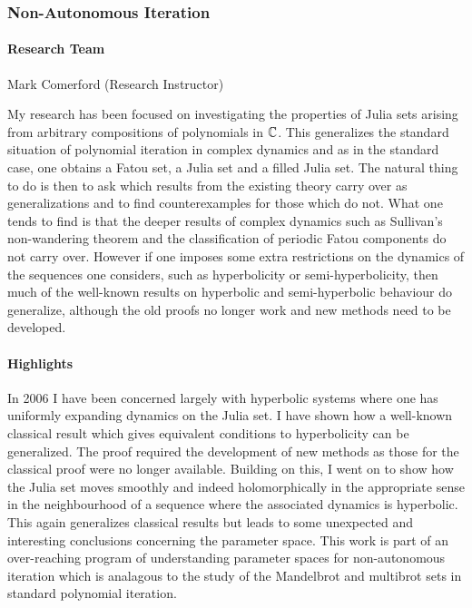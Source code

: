\subsubsection{Non-Autonomous Iteration}

\paragraph{Research Team}
Mark Comerford (Research Instructor)

\medskip

My research has been focused on investigating the properties of Julia sets
arising from arbitrary compositions of polynomials in $\mathbb{C}$. This generalizes
the standard situation of polynomial iteration in complex dynamics and as in
the standard case, one obtains a Fatou set, a Julia set and a filled Julia set.
The natural thing to do is then to ask which results from the existing theory
carry over as generalizations and to find counterexamples for those which do
not. What one tends to find is that the deeper results of complex dynamics such
as  Sullivan's non-wandering theorem and the classification of periodic Fatou
components do not carry over. However if one imposes some extra restrictions on
the dynamics of the sequences one considers, such as hyperbolicity or
semi-hyperbolicity, then much of the well-known results on hyperbolic and
semi-hyperbolic behaviour do generalize, although the old proofs no longer work
and new methods need to be developed.  

\paragraph{Highlights}

In 2006 I have been concerned largely with hyperbolic systems where one has
uniformly expanding dynamics on the Julia set. I have shown how a well-known
classical result which gives equivalent conditions to hyperbolicity can be
generalized. The proof required the development of new methods as those for the
classical proof were no longer available.  Building on this, I went on to show
how the Julia set moves smoothly and indeed holomorphically in the appropriate
sense in the neighbourhood of  a sequence where the associated dynamics is
hyperbolic. This again generalizes classical results but leads to some
unexpected and interesting conclusions concerning the parameter space. This
work is part of an over-reaching program of understanding parameter spaces for
non-autonomous iteration which  is analagous to the study of the Mandelbrot and
multibrot sets in standard polynomial iteration. 

